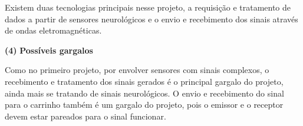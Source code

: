 \documentclass[11pt]{article}
\renewcommand\part[1]{\vspace{.10in}\textbf{(#1)}}
\newcommand\gargalos{\vspace{.10in}\textbf{Possíveis gargalos}}
\begin{document}
Existem duas tecnologias principais nesse projeto, a requisição e tratamento de dados a partir de sensores neurológicos e o envio e recebimento dos sinais através de ondas eletromagnéticas.

\raggedright
\part{4} \gargalos

\RaggedRight
Como no primeiro projeto, por envolver sensores com sinais complexos, o recebimento e tratamento dos sinais gerados é o principal gargalo do projeto, ainda mais se tratando de sinais neurológicos. O envio e recebimento do sinal para o carrinho também é um gargalo do projeto, pois o emissor e o receptor devem estar pareados para o sinal funcionar.


{}

\end{document}
